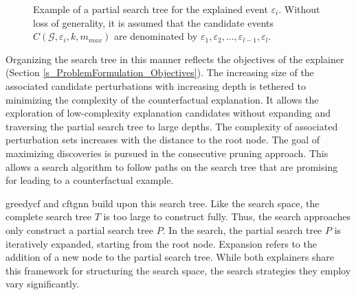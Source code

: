 

\begin{figure} [ht]
    \centering
    
    \caption{Example of a partial search tree for the explained event $\varepsilon_i$. Without loss of generality, it is assumed that the candidate events $C(\mathcal{G}, \varepsilon_i, k, m_{max})$ are denominated by $\varepsilon_1, \varepsilon_2, ..., \varepsilon_{l - 1}, \varepsilon_{l}$.}
    \label{f_SearchTree_Example}
\end{figure}

Organizing the search tree in this manner reflects the objectives of the explainer (Section \ref{s_ProblemFormulation_Objectives}). The increasing size of the associated candidate perturbations with increasing depth is tethered to minimizing the complexity of the counterfactual explanation. It allows the exploration of low-complexity explanation candidates without expanding and traversing the partial search tree to large depths. The complexity of associated perturbation sets increases with the distance to the root node. The goal of maximizing discoveries is pursued in the consecutive pruning approach. This allows a search algorithm to follow paths on the search tree that are promising for leading to a counterfactual example.

\gls{greedycf} and \gls{cftgnn} build upon this search tree. Like the search space, the complete search tree $T$ is too large to construct fully. Thus, the search approaches only construct a partial search tree $P$. In the search, the partial search tree $P$ is iteratively expanded, starting from the root node. Expansion refers to the addition of a new node to the partial search tree. While both explainers share this framework for structuring the search space, the search strategies they employ vary significantly.



